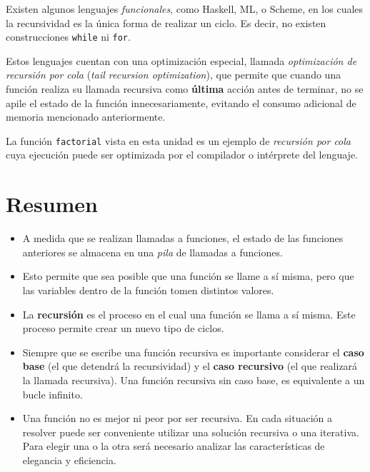 \begin{sabias_que}
Existen algunos lenguajes {\it funcionales}, como Haskell, ML, o Scheme, en
los cuales la recursividad es la única forma de realizar un ciclo.  Es
decir, no existen construcciones {\tt while} ni {\tt for}.

Estos lenguajes cuentan con una optimización especial, llamada {\it
optimización de recursión por cola} ({\it tail recursion optimization}),
que permite que cuando una función realiza su llamada recursiva como {\bf
última} acción antes de terminar, no se apile el estado de la función
innecesariamente, evitando el consumo adicional de memoria mencionado
anteriormente.

La función \lstinline!factorial! vista en esta unidad es un ejemplo de {\it
recursión por cola} cuya ejecución puede ser optimizada por el compilador o
intérprete del lenguaje.
\end{sabias_que}

\section{Resumen}

\begin{itemize}

\item A medida que se realizan llamadas a funciones, el estado de las
funciones anteriores se almacena en una {\it pila} de llamadas a funciones.

\item Esto permite que sea posible que una función se llame a sí misma,
pero que las variables dentro de la función tomen distintos valores.

\item La {\bf recursión} es el proceso en el cual una función se llama a
sí misma.  Este proceso permite crear un nuevo tipo de ciclos.

\item Siempre que se escribe una función recursiva es importante considerar
el {\bf caso base} (el que detendrá la recursividad) y el {\bf caso
recursivo} (el que realizará la llamada recursiva).  Una función recursiva
sin caso base, es equivalente a un bucle infinito.

\item Una función no es mejor ni peor por ser recursiva.  En cada situación
a resolver puede ser conveniente utilizar una solución recursiva o una
iterativa.  Para elegir una o la otra será necesario analizar las
características de elegancia y eficiencia.

\end{itemize}


